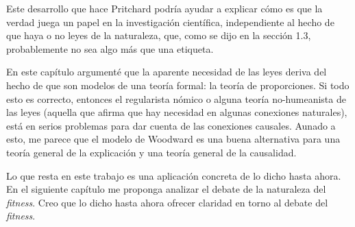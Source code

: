 Este desarrollo que hace Pritchard podría ayudar a explicar cómo es que la verdad juega un papel en la investigación científica, independiente al hecho de que haya o no leyes de la naturaleza, que, como se dijo en la sección 1.3, probablemente no sea algo más que una etiqueta.

En este capítulo argumenté que la aparente necesidad de las%
leyes deriva del hecho de que son modelos de una teoría formal: la teoría de proporciones. Si todo esto es correcto, entonces el regularista nómico o alguna teoría no-humeanista de las leyes (aquella que afirma que hay necesidad en algunas conexiones naturales), está en serios problemas para dar cuenta de las conexiones causales. Aunado a esto, me parece que el modelo de Woodward es una buena alternativa para una teoría general de la explicación y una teoría general de la causalidad.

Lo que resta en este trabajo es una aplicación concreta de lo dicho hasta ahora. En el siguiente capítulo me proponga analizar el debate de la naturaleza del \emph{fitness}. Creo que lo dicho hasta ahora ofrecer claridad en torno al debate del \emph{fitness}.



